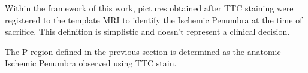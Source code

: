 Within the framework of this work, pictures obtained after TTC staining were registered to the template MRI to identify the Ischemic Penumbra at the time of sacrifice.
%
This definition is simplistic and doesn't represent a clinical decision.

The P-region defined in the previous section is determined as the anatomic Ischemic Penumbra observed using TTC stain.





 



 




 


